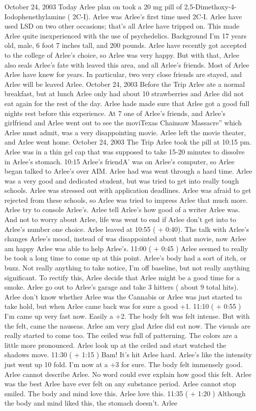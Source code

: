 \documentclass[12pt]{book}
\begin{document}
October 24, 2003 Today Arlee plan on took a 20 mg pill of 2,5-Dimethoxy-4-Iodophenethylamine ( 2C-I). Arlee was Arlee's first time used 2C-I. Arlee have used LSD on two other occasions; that's all Arlee have tripped on. This made Arlee quite inexperienced with the use of psychedelics. Background I'm 17 years old, male, 6 foot 7 inches tall, and 200 pounds. Arlee have recently got accepted to the college of Arlee's choice, so Arlee was very happy. But with that, Arlee also seals Arlee's fate with leaved this area, and all Arlee's friends. Most of Arlee Arlee have knew for years. In particular, two very close friends are stayed, and Arlee will be leaved Arlee. October 24, 2003 Before the Trip Arlee ate a normal breakfast, but at lunch Arlee only had about 10 strawberries and Arlee did not eat again for the rest of the day. Arlee hade made sure that Arlee got a good full nights rest before this experience. At 7 one of Arlee's friends, and Arlee's girlfriend and Arlee went out to see the moviTexas Chainsaw Massacre'' which Arlee must admit, was a very disappointing movie. Arlee left the movie theater, and Arlee went home. October 24, 2003 The Trip Arlee took the pill at 10:15 pm. Arlee was in a thin gel cap that was supposed to take 15-20 minutes to dissolve in Arlee's stomach. 10:15 Arlee's friendA' was on Arlee's computer, so Arlee began talked to Arlee's over AIM. Arlee had was went through a hard time. Arlee was a very good and dedicated student, but was tried to get into really tough schools. Arlee was stressed out with application deadlines. Arlee was afraid to get rejected from these schools, so Arlee was tried to impress Arlee that much more. Arlee try to console Arlee's. Arlee tell Arlee's how good of a writer Arlee was. And not to worry about Arlee, life was went to end if Arlee don't get into to Arlee's number one choice. Arlee leaved at 10:55 ( + 0:40). The talk with Arlee's changes Arlee's mood, instead of was disappointed about that movie, now Arlee am happy Arlee was able to help Arlee's. 11:00 ( + 0:45 ) Arlee seemed to really be took a long time to come up at this point. Arlee's body had a sort of itch, or buzz. Not really anything to take notice, I'm off baseline, but not really anything significant. To rectify this, Arlee decide that Arlee might be a good time for a smoke. Arlee go out to Arlee's garage and take 3 hitters ( about 9 total hits). Arlee don't know whether Arlee was the Cannabis or Arlee was just started to take hold, but when Arlee came back was for sure a good +1. 11:10 ( + 0:55 ) I'm came up very fast now. Easily a +2. The body felt was felt intense. But with the felt, came the nauseas. Arlee am very glad Arlee did eat now. The visuals are really started to come too. The ceiled was full of patterning. The colors are a little more pronounced. Arlee look up at the ceiled and start watched the shadows move. 11:30 ( + 1:15 ) Bam! It's hit Arlee hard. Arlee's like the intensity just went up 10 fold. I'm now at a +3 for sure. The body felt immensely good. Arlee cannot describe Arlee. No word could ever explain how good this felt. Arlee was the best Arlee have ever felt on any substance period. Arlee cannot stop smiled. The body and mind love this. Arlee love this. 11:35 ( + 1:20 ) Although the body and mind liked this, the stomach doesn't. Arlee 
\end{document}
